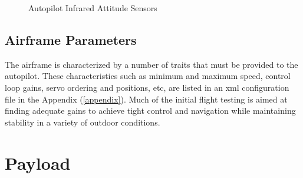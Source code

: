 \documentclass[a4paper,11pt]{report}
\begin{document}
\begin{figure}[ht]
  \centering
  \caption{Autopilot Infrared Attitude Sensors}
  \label{fig:ir}
\end{figure}


\subsection{Airframe Parameters}

The airframe is characterized by a number of traits that must be provided to the autopilot. These characteristics such as minimum and maximum speed, control loop gains, servo ordering and positions, etc, are listed in an xml configuration file in the Appendix (\ref{appendix}). Much of the initial flight testing is aimed at finding adequate gains to achieve tight control and navigation while maintaining stability in a variety of outdoor conditions.

\section{Payload}
\end{document}
